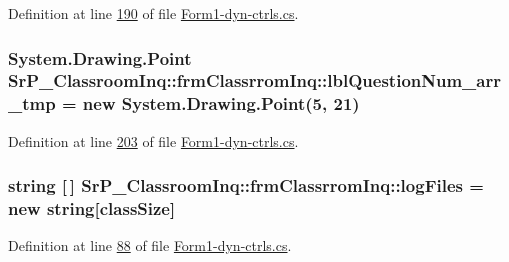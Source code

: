 \-Definition at line \hyperlink{_form1-dyn-ctrls_8cs_source_l00190}{190} of file \hyperlink{_form1-dyn-ctrls_8cs_source}{\-Form1-\/dyn-\/ctrls.\-cs}.

\hypertarget{class_sr_p___classroom_inq_1_1frm_classrrom_inq_a9af0d3cc5171be1c8b01ea1e208d61ee}{
\subsubsection[{lbl\-Question\-Num\-\_\-arr\-\_\-tmp}]{\setlength{\rightskip}{0pt plus 5cm}\-System.\-Drawing.\-Point {\bf \-Sr\-P\-\_\-\-Classroom\-Inq\-::frm\-Classrrom\-Inq\-::lbl\-Question\-Num\-\_\-arr\-\_\-tmp} = new \-System.\-Drawing.\-Point(5, 21)}}
\label{class_sr_p___classroom_inq_1_1frm_classrrom_inq_a9af0d3cc5171be1c8b01ea1e208d61ee}


\-Definition at line \hyperlink{_form1-dyn-ctrls_8cs_source_l00203}{203} of file \hyperlink{_form1-dyn-ctrls_8cs_source}{\-Form1-\/dyn-\/ctrls.\-cs}.

\hypertarget{class_sr_p___classroom_inq_1_1frm_classrrom_inq_a1b23b6935997df29f1b06ed831495076}{
\subsubsection[{log\-Files}]{\setlength{\rightskip}{0pt plus 5cm}string \mbox{[}$\,$\mbox{]} {\bf \-Sr\-P\-\_\-\-Classroom\-Inq\-::frm\-Classrrom\-Inq\-::log\-Files} = new string\mbox{[}{\bf class\-Size}\mbox{]}}}
\label{class_sr_p___classroom_inq_1_1frm_classrrom_inq_a1b23b6935997df29f1b06ed831495076}


\-Definition at line \hyperlink{_form1-dyn-ctrls_8cs_source_l00088}{88} of file \hyperlink{_form1-dyn-ctrls_8cs_source}{\-Form1-\/dyn-\/ctrls.\-cs}.

